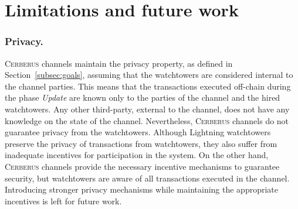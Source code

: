 \documentclass[runningheads]{llncs}
\newcommand{\sys}{\textsc{Cerberus}\xspace}
\begin{document}

\section{Limitations and future work}\label{sec:limit}

\vspace{-3pt}
\subsubsection*{Privacy.}
\sys channels maintain the privacy property, as defined in Section~\ref{subsec:goals}, assuming that the watchtowers are considered internal to the channel parties. This means that the transactions executed off-chain during the phase \textit{Update} are known only to the parties of the channel and the hired watchtowers. Any other third-party, external to the channel, does not have any knowledge on the state of the channel.
Nevertheless, \sys channels do not guarantee privacy from the watchtowers.
Although Lightning watchtowers preserve the privacy of transactions from watchtowers, they also suffer from inadequate incentives for participation in the system. On the other hand, \sys channels provide the necessary incentive mechanisms to guarantee security, but watchtowers are aware of all transactions executed in the channel.
Introducing stronger privacy mechanisms while maintaining the appropriate incentives is left for future work.

\vspace{-3pt}
\end{document}
